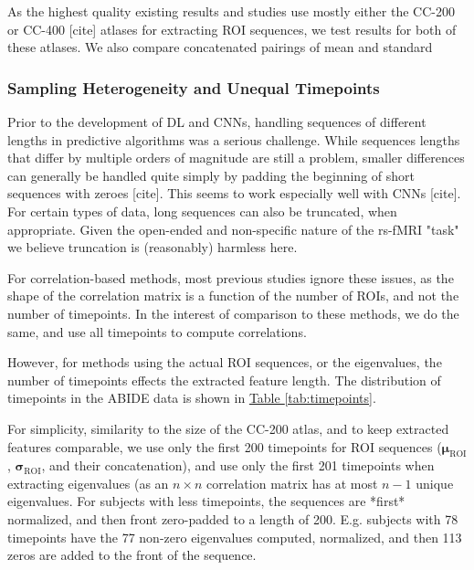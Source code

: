 \documentclass[10pt]{article}
\newcommand{\tsub}[2]{\mathbf{#1}_{\text{#2}}}
\begin{document}
As the highest quality existing results and studies use mostly either the CC-200 or CC-400 [cite] atlases for extracting
ROI sequences, we test results for both of these atlases. We also compare concatenated pairings of mean and standard

\subsubsection{Sampling Heterogeneity and Unequal Timepoints}

Prior to the development of DL and CNNs, handling sequences of different lengths in predictive
algorithms was a serious challenge. While sequences lengths that differ by multiple orders of
magnitude are still a problem, smaller differences can generally be handled quite simply by padding
the beginning  of short sequences with zeroes [cite]. This seems to work especially well with CNNs
[cite]. For certain types of data, long sequences can also be truncated, when appropriate. Given the
open-ended and non-specific nature of the rs-fMRI "task" we believe truncation is (reasonably)
harmless here.

For correlation-based methods, most previous studies ignore these issues, as the shape of the
correlation matrix is a function of the number of ROIs, and not the number of timepoints. In the
interest of comparison to these methods, we do the same, and use all timepoints to compute correlations.

However, for methods using the actual ROI sequences, or the eigenvalues, the number of timepoints
effects the extracted feature length. The distribution of timepoints in the ABIDE data is shown in
\hyperref[tab:timepoints]{Table \ref{tab:timepoints}}.

For simplicity, similarity to the size of the CC-200 atlas, and to keep extracted features
comparable, we use only the first 200 timepoints for ROI sequences (\(\tsub{\mu}{ROI}\),
\(\tsub{\sigma}{ROI}\), and their concatenation), and use only the first 201 timepoints when
extracting eigenvalues (as an \(n \times n\) correlation matrix has at most \(n-1\) unique
eigenvalues. For subjects with less timepoints, the sequences are *first* normalized, and then front
zero-padded to a length of 200. E.g. subjects with 78 timepoints have the 77 non-zero eigenvalues
computed, normalized, and then 113 zeros are added to the front of the sequence.
\end{document}

